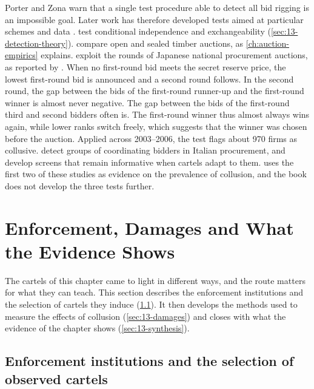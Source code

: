 Porter and Zona warn that a single test procedure able to detect all bid rigging is an impossible goal. Later work
has therefore developed tests aimed at particular schemes and data \citep[p.~210]{AskerNocke2021}.
\citet{BajariYe2003} test conditional independence and exchangeability (\cref{sec:13-detection-theory}).
\citet{AtheyLevinSeira2011} compare open and sealed timber auctions, as \cref{ch:auction-empirics} explains.
\citet{KawaiNakabayashi2020} exploit the rounds of Japanese national procurement auctions, as reported by
\citet[pp.~184--185]{AskerNocke2021}. When no first-round bid meets the secret reserve price, the lowest
first-round bid is announced and a second round follows. In the second round, the gap between the bids of the
first-round runner-up and the first-round winner is almost never negative. The gap between the bids of the
first-round third and second bidders often is. The first-round winner thus almost always wins again, while lower
ranks switch freely, which suggests that the winner was chosen before the auction. Applied across 2003--2006, the
test flags about 970 firms as collusive. \citet{ConleyDecarolis2016} detect groups of coordinating bidders in Italian
procurement, and \citet{OrtnerEtAl2020} develop screens that remain informative when cartels adapt to them.
 uses the first two of these studies as evidence on the prevalence of collusion, and the book
does not develop the three tests further.

\section{Enforcement, Damages and What the Evidence Shows}\label{sec:13-enforcement}

The cartels of this chapter came to light in different ways, and the route matters for what they can teach. This
section describes the enforcement institutions and the selection of cartels they induce
(\cref{sec:13-institutions}). It then develops the methods used to measure the effects of collusion
(\cref{sec:13-damages}) and closes with what the evidence of the chapter shows (\cref{sec:13-synthesis}).

\subsection{Enforcement institutions and the selection of observed cartels}\label{sec:13-institutions}

